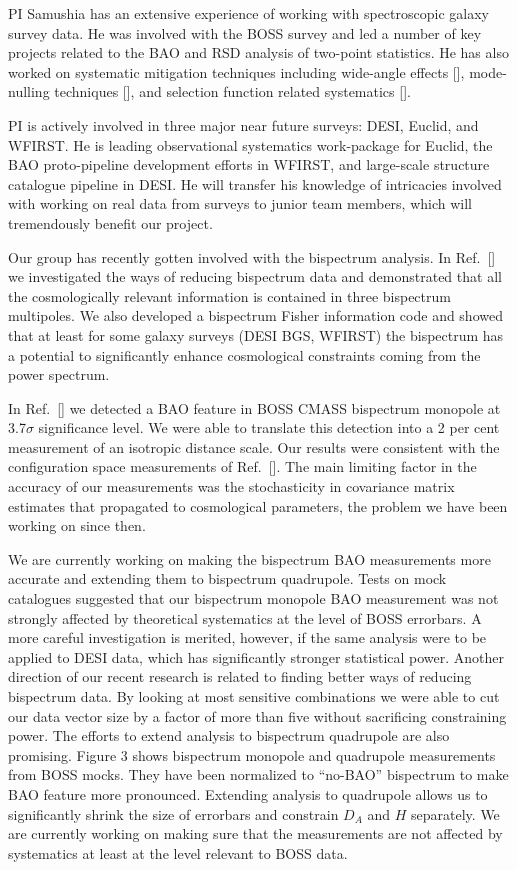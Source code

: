 PI Samushia has an extensive experience of working with spectroscopic galaxy
survey data. He was involved with the BOSS survey and led a number of key
projects related to the BAO and RSD analysis of two-point statistics. He has
also worked on systematic mitigation techniques including wide-angle effects
[], mode-nulling techniques [], and selection function related systematics [].

PI is actively involved in three major near future surveys: DESI, Euclid, and
WFIRST. He is leading observational systematics work-package for Euclid, the
BAO proto-pipeline development efforts in WFIRST, and large-scale structure
catalogue pipeline in DESI. He will transfer his knowledge of intricacies
involved with working on real data from surveys to junior team members, which
will tremendously benefit our project.

Our group has recently gotten involved with the bispectrum analysis. In Ref.~[]
we investigated the ways of reducing bispectrum data and demonstrated that all
the cosmologically relevant information is contained in three bispectrum
multipoles. We also developed a bispectrum Fisher information code and showed
that at least for some galaxy surveys (DESI BGS, WFIRST) the bispectrum has a
potential to significantly enhance cosmological constraints coming from the
power spectrum.

In Ref.~[] we detected a BAO feature in BOSS CMASS bispectrum monopole at
3.7$\sigma$ significance level. We were able to translate this detection into a
2 per cent measurement of an isotropic distance scale. Our results were
consistent with the configuration space measurements of Ref.~[]. The main
limiting factor in the accuracy of our measurements was the stochasticity in
covariance matrix estimates that propagated to cosmological parameters, the
problem we have been working on since then.

We are currently working on making the bispectrum BAO measurements more
accurate and extending them to bispectrum quadrupole. Tests on mock
catalogues suggested that our bispectrum monopole BAO measurement was not
strongly affected by theoretical systematics at the level of BOSS errorbars. A
more careful investigation is merited, however, if the same analysis were to be
applied to DESI data, which has significantly stronger statistical power.
Another direction of our recent research is related to finding better ways of
reducing bispectrum data. By looking at most sensitive combinations we were
able to cut our data vector size by a factor of more than five without
sacrificing constraining power. The efforts to extend analysis to bispectrum
quadrupole are also promising. Figure 3 shows bispectrum monopole and
quadrupole measurements from BOSS mocks. They have been normalized to
``no-BAO'' bispectrum to make BAO feature more pronounced. Extending analysis
to quadrupole allows us to significantly shrink the size of errorbars and
constrain $D_A$ and $H$ separately. We are currently working on making sure
that the measurements are not affected by systematics at least at the level
relevant to BOSS data.

